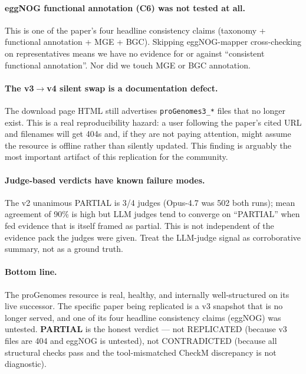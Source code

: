 \documentclass[11pt]{article}
\begin{document}
\paragraph{eggNOG functional annotation (C6) was not tested at all.}
This is one of the paper's four headline consistency claims (taxonomy +
functional annotation + MGE + BGC). Skipping eggNOG-mapper cross-checking on
representatives means we have no evidence for or against ``consistent
functional annotation''. Nor did we touch MGE or BGC annotation.

\paragraph{The v3$\to$v4 silent swap is a documentation defect.}
The download page HTML still advertises \texttt{proGenomes3\_*} files that no
longer exist. This is a real reproducibility hazard: a user following the
paper's cited URL and filenames will get 404s and, if they are not paying
attention, might assume the resource is offline rather than silently updated.
This finding is arguably the most important artifact of this replication for
the community.

\paragraph{Judge-based verdicts have known failure modes.}
The v2 unanimous PARTIAL is 3/4 judges (Opus-4.7 was 502 both runs); mean
agreement of 90\% is high but LLM judges tend to converge on ``PARTIAL'' when
fed evidence that is itself framed as partial. This is not independent of the
evidence pack the judges were given. Treat the LLM-judge signal as
corroborative summary, not as a ground truth.

\paragraph{Bottom line.}
The proGenomes resource is real, healthy, and internally well-structured on
its live successor. The specific paper being replicated is a v3 snapshot that
is no longer served, and one of its four headline consistency claims (eggNOG)
was untested. \textbf{PARTIAL} is the honest verdict --- not REPLICATED
(because v3 files are 404 and eggNOG is untested), not CONTRADICTED
(because all structural checks pass and the tool-mismatched CheckM
discrepancy is not diagnostic).
\end{document}
